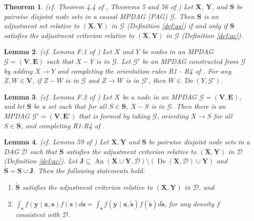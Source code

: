 \documentclass[twoside]{article}
\newtheorem{theorem}{Theorem}
\newtheorem{lemma}[theorem]{Lemma}
\DeclareMathOperator{\An}{An}
\DeclareMathOperator{\De}{De}
\newcommand{\mb}[1]{\mathbf{#1}}
\newcommand{\g}[1][G]{\mathcal{#1}}
\begin{document}
\begin{theorem}
\label{thm:ac-as}
{\normalfont (cf. Theorem 4.4 of \citealp{perkovic2017interpreting}, Theorems 5 and 56 of \citealp{perkovic2018complete})}
    Let $\mb{X}$, $\mb{Y}$, and $\mb{S}$ be pairwise disjoint node sets in a causal MPDAG (PAG) $\g$. Then $\mb{S}$ is an adjustment set relative to $(\mb{X,Y})$ in $\g$ (Definition \ref{def:as}) if and only if $\mb{S}$ satisfies the adjustment criterion relative to $(\mb{X,Y})$ in $\g$ (Definition \ref{def:ac}).
\end{theorem}


\begin{lemma} 
\label{lem:adding-edges-imply}
{\normalfont (cf. Lemma F.1 of \citealp{rothenhausler2018causal})}
    Let $X$ and $Y$ be nodes in an MPDAG $\g = (\mb{V,E})$ such that $X - Y$ is in $\g$. Let $\g'$ be an MPDAG constructed from $\g$ by adding $X \to Y$ and completing the orientation rules R1 - R4 of \cite{meek1995causal}. For any $Z,W \in \mb{V}$, if $Z - W$ is in $\g$ and $Z \rightarrow W$ is in $\g'$, then $W \in \De(Y,\g')$.
\end{lemma}




\begin{lemma}
\label{lem:undirected-imply}
{\normalfont (cf. Lemma F.2 of \citealp{rothenhausler2018causal})}
    Let $X$ be a node in an MPDAG $\g=(\mb{V}, \mb{E})$, and let $\mb{S}$ be a set such that for all $S \in \mb{S}$, $X - S$ is in $\g$. Then there is an MPDAG $\g' = (\mb{V}, \mb{E'})$ that is formed by taking $\g$, orienting $X \to S$ for all $S \in \mb{S}$, and completing R1-R4 of \cite{meek1995causal}.
\end{lemma}


\begin{lemma} 
\label{lem:sound-setup1-perk}
{\normalfont (cf. Lemma 59 of \citealp{perkovic2018complete})}
    Let $\mb{X},\mb{Y}$ and $\mb{S}$ be pairwise disjoint node sets in a DAG $\g[D]$ such that $\mb{S}$ satisfies the adjustment criterion relative to $(\mb{X,Y})$ in $\g[D]$ (Definition \ref{def:ac}). Let $\mb{J} \subseteq \An(\mb{X} \cup \mb{Y},\g[D]) \setminus (\De(\mb{X}, \g[D]) \cup \mb{Y})$ and $\mb{\tilde{S}} = \mb{S} \cup \mb{J}$. Then the following statements hold:
    \begin{enumerate}[label = (\roman*)]
        \item $\mb{\tilde{S}}$ satisfies the adjustment criterion relative to $(\mb{X,Y})$ in $\g[D]$, and
        \item $\int_\mb{s} f(\mb{y} \mid \mb{x,s})f(\mb{s}) d\mb{s} = \int_{\mb{\tilde{s}}} f(\mb{y} \mid \mb{x,\tilde{s}}) f(\mb{\tilde{s}}) d\mb{\tilde{s}}$, for any density $f$ consistent with $\g[D]$.
    \end{enumerate}
\end{lemma}
\end{document}
